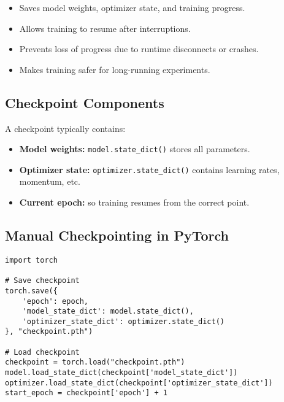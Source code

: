 \documentclass[a4paper, 12pt]{article}
\begin{document}
\begin{tcolorbox}[colback=blue!5!white, colframe=blue!75!black, title=Why Checkpointing is Important]
\begin{itemize}
    \item Saves model weights, optimizer state, and training progress.
    \item Allows training to resume after interruptions.
    \item Prevents loss of progress due to runtime disconnects or crashes.
    \item Makes training safer for long-running experiments.
\end{itemize}
\end{tcolorbox}

\subsection*{Checkpoint Components}
A checkpoint typically contains:
\begin{itemize}
    \item \textbf{Model weights:} \texttt{model.state\_dict()} stores all parameters.
    \item \textbf{Optimizer state:} \texttt{optimizer.state\_dict()} contains learning rates, momentum, etc.
    \item \textbf{Current epoch:} so training resumes from the correct point.
\end{itemize}

\subsection*{Manual Checkpointing in PyTorch}
\begin{tcolorbox}[colback=yellow!5!white, colframe=yellow!75!black, title=PyTorch Example]
\begin{verbatim}
import torch

# Save checkpoint
torch.save({
    'epoch': epoch,
    'model_state_dict': model.state_dict(),
    'optimizer_state_dict': optimizer.state_dict()
}, "checkpoint.pth")

# Load checkpoint
checkpoint = torch.load("checkpoint.pth")
model.load_state_dict(checkpoint['model_state_dict'])
optimizer.load_state_dict(checkpoint['optimizer_state_dict'])
start_epoch = checkpoint['epoch'] + 1
\end{verbatim}
\end{tcolorbox}
\end{document}
